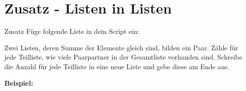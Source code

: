 \section{Zusatz - Listen in Listen}
\begin{frame}{Zusatz}
	Füge folgende Liste in dein Script ein:
	
	Zwei Listen, deren Summe der Elemente gleich sind, bilden ein Paar. Zähle für jede Teilliste, wie viele Paarpartner in der Gesamtliste vorhanden sind. Schreibe die Anzahl für jede Teilliste in eine neue Liste und gebe diese am Ende aus.
	
	\textbf{Beispiel:}
	
	
\end{frame}


